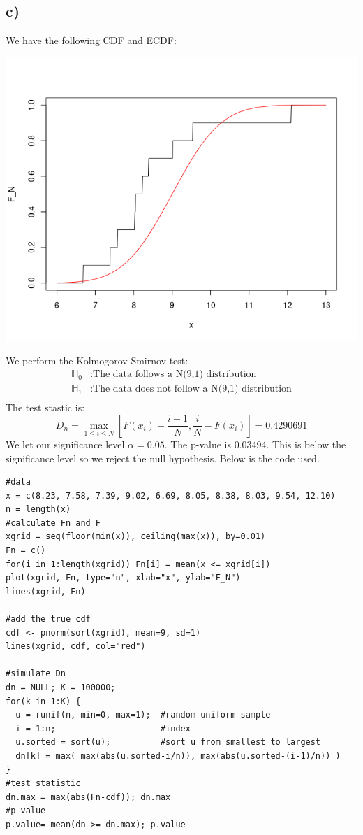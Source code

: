 \documentclass{article}
\begin{document}
\subsection*{c)}
We have the following CDF and ECDF:
\begin{center}
\includegraphics[scale=0.7]{cdf.png}
\end{center}
We perform the Kolmogorov-Smirnov test:
\begin{align*}
\mathbb{H}_0&: \text{The data follows a N(9,1) distribution}\\
\mathbb{H}_1&: \text{The data does not follow a N(9,1) distribution}\\
\end{align*}
The test stastic is:
$$D_n=\max_{1\leq i\leq N}\left[F(x_i)-\frac{i-1}{N},\frac{i}{N}-F(x_i)\right]=0.4290691$$
We let our significance level $\alpha=0.05$. The p-value is 0.03494. This is below the significance level so we reject the null hypothesis. Below is the code used.
\begin{lstlisting}
#data
x = c(8.23, 7.58, 7.39, 9.02, 6.69, 8.05, 8.38, 8.03, 9.54, 12.10)
n = length(x)
#calculate Fn and F
xgrid = seq(floor(min(x)), ceiling(max(x)), by=0.01)
Fn = c()
for(i in 1:length(xgrid)) Fn[i] = mean(x <= xgrid[i]) 
plot(xgrid, Fn, type="n", xlab="x", ylab="F_N")
lines(xgrid, Fn)

#add the true cdf
cdf <- pnorm(sort(xgrid), mean=9, sd=1)
lines(xgrid, cdf, col="red")

#simulate Dn
dn = NULL; K = 100000;
for(k in 1:K) {
  u = runif(n, min=0, max=1);  #random uniform sample
  i = 1:n;                     #index
  u.sorted = sort(u);          #sort u from smallest to largest
  dn[k] = max( max(abs(u.sorted-i/n)), max(abs(u.sorted-(i-1)/n)) ) 
}
#test statistic
dn.max = max(abs(Fn-cdf)); dn.max
#p-value
p.value= mean(dn >= dn.max); p.value
\end{lstlisting}
\end{document}

